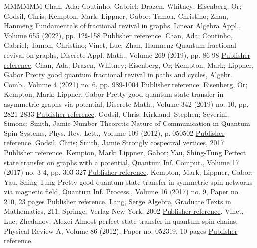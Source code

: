 \begin{thebibliography}{MMMMMM}
 Chan, Ada; Coutinho, Gabriel; Drazen, Whitney; Eisenberg, Or; Godsil, Chris; Kempton, Mark; Lippner, Gabor; Tamon, Christino; Zhan, Hanmeng Fundamentals of fractional revival in graphs, Linear Algebra Appl., Volume 655 (2022), pp. 129-158 \href{https://alco.centre-mersenne.org/articles/10.5802/alco.379/#chan2020fundamentals}{Publisher reference}.
 Chan, Ada; Coutinho, Gabriel; Tamon, Christino; Vinet, Luc; Zhan, Hanmeng Quantum fractional revival on graphs, Discrete Appl. Math., Volume 269 (2019), pp. 86-98 \href{https://alco.centre-mersenne.org/articles/10.5802/alco.379/#ChanCoutinhoTamonVinetZhan}{Publisher reference}.
 Chan, Ada; Drazen, Whitney; Eisenberg, Or; Kempton, Mark; Lippner, Gabor Pretty good quantum fractional revival in paths and cycles, Algebr. Comb., Volume 4 (2021) no. 6, pp. 989-1004 \href{https://alco.centre-mersenne.org/articles/10.5802/alco.379/#chan2020approximate}{Publisher reference}.
 Eisenberg, Or; Kempton, Mark; Lippner, Gabor Pretty good quantum state transfer in asymmetric graphs via potential, Discrete Math., Volume 342 (2019) no. 10, pp. 2821-2833 \href{https://alco.centre-mersenne.org/articles/10.5802/alco.379/#eisenberg2019pretty}{Publisher reference}.
 Godsil, Chris; Kirkland, Stephen; Severini, Simone; Smith, Jamie Number-Theoretic Nature of Communication in Quantum Spin Systems, Phys. Rev. Lett., Volume 109 (2012), p. 050502 \href{https://alco.centre-mersenne.org/articles/10.5802/alco.379/#Godsil2012}{Publisher reference}.
 Godsil, Chris; Smith, Jamie Strongly cospectral vertices, 2017 \href{https://alco.centre-mersenne.org/articles/10.5802/alco.379/#godsil_smith_2017}{Publisher reference}.
 Kempton, Mark; Lippner, Gabor; Yau, Shing-Tung Perfect state transfer on graphs with a potential, Quantum Inf. Comput., Volume 17 (2017) no. 3-4, pp. 303-327 \href{https://alco.centre-mersenne.org/articles/10.5802/alco.379/#us}{Publisher reference}.
 Kempton, Mark; Lippner, Gabor; Yau, Shing-Tung Pretty good quantum state transfer in symmetric spin networks via magnetic field, Quantum Inf. Process., Volume 16 (2017) no. 9, Paper no. 210, 23 pages \href{https://alco.centre-mersenne.org/articles/10.5802/alco.379/#invol}{Publisher reference}.
 Lang, Serge Algebra, Graduate Texts in Mathematics, 211, Springer-Verlag New York, 2002 \href{https://alco.centre-mersenne.org/articles/10.5802/alco.379/#lang_book}{Publisher reference}.
 Vinet, Luc; Zhedanov, Alexei Almost perfect state transfer in quantum spin chains, Physical Review A, Volume 86 (2012), Paper no. 052319, 10 pages \href{https://alco.centre-mersenne.org/articles/10.5802/alco.379/#Vinet2012}{Publisher reference}.
\end{thebibliography}
